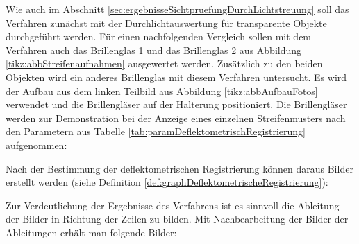 Wie auch im Abschnitt \ref{sec:ergebnisseSichtpruefungDurchLichtstreuung} soll das Verfahren zunächst mit der Durchlichtauswertung für transparente Objekte durchgeführt werden.
Für einen nachfolgenden Vergleich sollen mit dem Verfahren auch das Brillenglas 1 und das Brillenglas 2 aus Abbildung \ref{tikz:abbStreifenaufnahmen} ausgewertet werden.
Zusätzlich zu den beiden Objekten wird ein anderes Brillenglas mit diesem Verfahren untersucht.
Es wird der Aufbau aus dem linken Teilbild aus Abbildung \ref{tikz:abbAufbauFotos} verwendet und die Brillengläser auf der Halterung positioniert.
Die Brillengläser werden zur Demonstration bei der Anzeige eines einzelnen Streifenmusters nach den Parametern aus Tabelle \ref{tab:paramDeflektometrischRegistrierung} aufgenommen:

{
	\begin{figure}[H]
		\centering
		
		\label{tikz:abbSinusStreifenaufnahmen}
	\end{figure}
}

\noindent
Nach der Bestimmung der deflektometrischen Registrierung können daraus Bilder erstellt werden (siehe Definition \ref{def:graphDeflektometrischeRegistrierung}):

{
	\begin{figure}[H]
		\centering
		
		\label{tikz:abbDeflectometricRegistrations}
	\end{figure}
}

\noindent
Zur Verdeutlichung der Ergebnisse des Verfahrens ist es sinnvoll die Ableitung der Bilder in Richtung der Zeilen zu bilden.
Mit Nachbearbeitung der Bilder der Ableitungen erhält man folgende Bilder:

{
	\begin{figure}[H]
		\centering
		
		\label{tikz:abbAbleitungRegistrierungDurchlicht}
	\end{figure}
}

